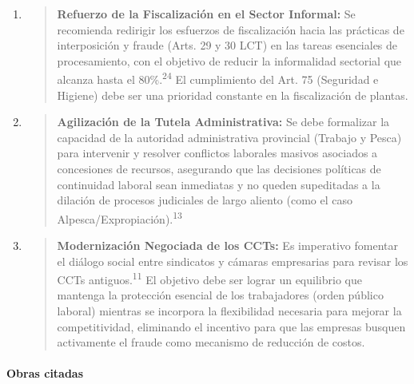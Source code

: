 \documentclass[]{article}
\begin{document}
\begin{enumerate}
\def\labelenumi{\arabic{enumi}.}
\item
  \begin{quote}
  \textbf{Refuerzo de la Fiscalización en el Sector Informal:} Se
  recomienda redirigir los esfuerzos de fiscalización hacia las
  prácticas de interposición y fraude (Arts. 29 y 30 LCT) en las tareas
  esenciales de procesamiento, con el objetivo de reducir la
  informalidad sectorial que alcanza hasta el 80\%.\textsuperscript{24}
  El cumplimiento del Art. 75 (Seguridad e Higiene) debe ser una
  prioridad constante en la fiscalización de plantas.
  \end{quote}
\item
  \begin{quote}
  \textbf{Agilización de la Tutela Administrativa:} Se debe formalizar
  la capacidad de la autoridad administrativa provincial (Trabajo y
  Pesca) para intervenir y resolver conflictos laborales masivos
  asociados a concesiones de recursos, asegurando que las decisiones
  políticas de continuidad laboral sean inmediatas y no queden
  supeditadas a la dilación de procesos judiciales de largo aliento
  (como el caso Alpesca/Expropiación).\textsuperscript{13}
  \end{quote}
\item
  \begin{quote}
  \textbf{Modernización Negociada de los CCTs:} Es imperativo fomentar
  el diálogo social entre sindicatos y cámaras empresarias para revisar
  los CCTs antiguos.\textsuperscript{11} El objetivo debe ser lograr un
  equilibrio que mantenga la protección esencial de los trabajadores
  (orden público laboral) mientras se incorpora la flexibilidad
  necesaria para mejorar la competitividad, eliminando el incentivo para
  que las empresas busquen activamente el fraude como mecanismo de
  reducción de costos.
  \end{quote}
\end{enumerate}

\hypertarget{obras-citadas}{%
\paragraph{Obras citadas}\label{obras-citadas}}
\end{document}
